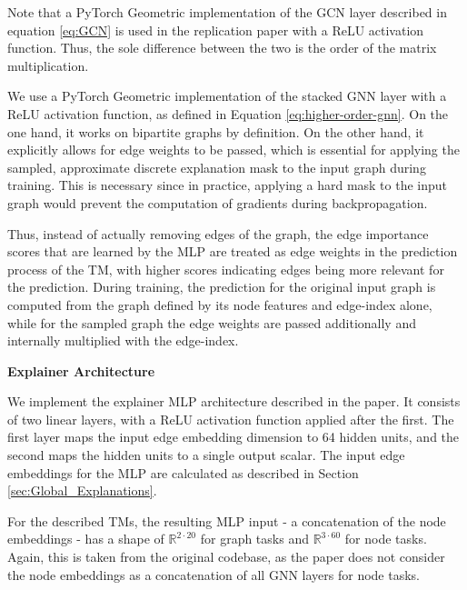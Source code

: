 Note that a PyTorch Geometric implementation of the GCN layer described in equation \ref{eq:GCN} is used in the replication paper \cite{holdijk2021re} with a ReLU activation function. Thus, the sole difference between the two is the order of the matrix multiplication. \bigskip

We use a PyTorch Geometric implementation of the stacked GNN layer with a ReLU activation function, as defined in Equation \ref{eq:higher-order-gnn}. On the one hand, it works on bipartite graphs by definition. On the other hand, it explicitly allows for edge weights to be passed, which is essential for applying the sampled, approximate discrete explanation mask to the input graph during training. This is necessary since in practice, applying a hard mask to the input graph would prevent the computation of gradients during backpropagation.

Thus, instead of actually removing edges of the graph, the edge importance scores that are learned by the MLP are treated as edge weights in the prediction process of the \ac{TM}, with higher scores indicating edges being more relevant for the prediction. During training, the prediction for the original input graph is computed from the graph defined by its node features and edge-index alone, while for the sampled graph the edge weights are passed additionally and internally multiplied with the edge-index.\bigskip

\textbf{Explainer Architecture}\par
We implement the explainer MLP architecture described in the paper. It consists of two linear layers, with a ReLU activation function applied after the first. The first layer maps the input edge embedding dimension to 64 hidden units, and the second maps the hidden units to a single output scalar. The input edge embeddings for the MLP are calculated as described in Section \ref{sec:Global_Explanations}. 

For the described \acp{TM}, the resulting MLP input - a concatenation of the node embeddings - has a shape of $\mathbb{R}^{2\cdot20}$ for graph tasks and $\mathbb{R}^{3\cdot60}$ for node tasks. Again, this is taken from the original codebase, as the paper does not consider the node embeddings as a concatenation of all GNN layers for node tasks.

